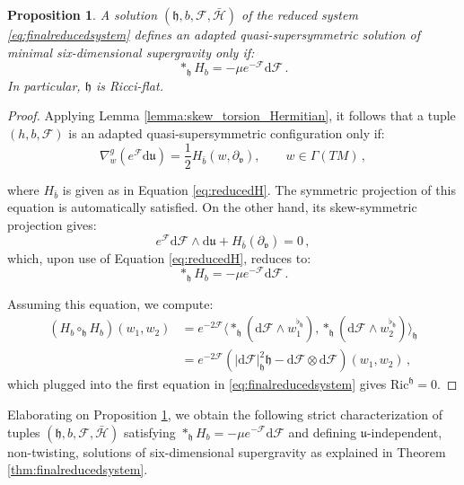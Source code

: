 \documentclass[10pt,a4paper,twoside,reqno]{amsart}
\theoremstyle{plain}
\newtheorem{prop}[thm]{Proposition}
\theoremstyle{definition}
\theoremstyle{remark}
\def\dd{\mathrm{d}}
\def\cH{\mathcal{H}}
\def\cF{\mathcal{F}}
\def\cH{\mathcal{H}}
\def\dd{\mathrm{d}}
\def\fru{\mathfrak{u}}
\def\frv{\mathfrak{v}}
\begin{document}
\begin{prop}
\label{prop:conditiondualH}
A solution $(\mathfrak{h},b,\cF,\bar{\cH})$ of the reduced system \eqref{eq:finalreducedsystem} defines an adapted quasi-super\-symmetric solution of minimal six-dimensional supergravity only if:
\begin{equation*}
\ast_{\mathfrak{h}}H_b = -\mu e^{-\cF} \dd\cF\, .
\end{equation*}
In particular, $\mathfrak{h}$ is Ricci-flat.
\end{prop}

\begin{proof}
Applying Lemma \ref{lemma:skew_torsion_Hermitian}, it follows that a tuple $(h,b,\cF)$ is an adapted quasi-supersymmetric configuration only if:  
\begin{equation*} 
\nabla^g_w (e^{\cF} \dd \fru) = \frac{1}{2}H_{\bar{b}}(w,\partial_{\frv}),\qquad  w\in\Gamma(TM)\, ,
\end{equation*}

\noindent
where $H_{\bar{b}}$ is given as in Equation \eqref{eq:reducedH}. The symmetric projection of this equation is automatically satisfied. On the other hand, its skew-symmetric projection gives:
\begin{equation*}
e^{\cF} \dd\cF \wedge \dd\fru  + H_{\bar{b}}(\partial_{\frv}) = 0\, ,
\end{equation*}
which, upon use of Equation \eqref{eq:reducedH}, reduces to:
\begin{equation*}
\ast_{\mathfrak{h}}H_b = -\mu e^{-\cF} \dd\cF\, .
\end{equation*}

\noindent
Assuming this equation, we compute:
\begin{align*}
(H_b\circ_{\mathfrak{h}} H_b)(w_1 , w_2) &= e^{-2\cF} \langle \ast_{\mathfrak{h}}(\dd\cF \wedge w_1^{\flat_{\mathfrak{h}}}) , \ast_{\mathfrak{h}}(\dd\cF \wedge w_2^{\flat_{\mathfrak{h}}}) \rangle_{\mathfrak{h}} \\
&= e^{-2\cF} (\vert \dd\cF\vert_{\mathfrak{h}}^2 \mathfrak{h} - \dd\cF \otimes \dd\cF)(w_1,w_2)\, ,
\end{align*}
which plugged into the first equation in \eqref{eq:finalreducedsystem} gives $\mathrm{Ric}^{\mathfrak{h}} = 0$.
\end{proof}

Elaborating on Proposition \ref{prop:conditiondualH}, we obtain the following strict characterization of tuples $(\mathfrak{h},b,\cF,\bar{\cH})$ satisfying $\ast_{\mathfrak{h}}H_b = -\mu e^{-\cF} \dd\cF$ and defining $\fru$-independent, non-twisting, solutions of six-dimensional supergravity as explained in Theorem \ref{thm:finalreducedsystem}.
\end{document}

